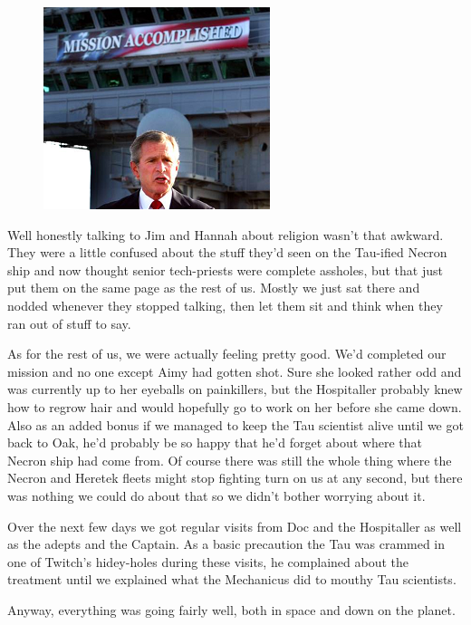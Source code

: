 \begin{figure}
	\begin{center}
		\includegraphics[width=\figwidth]{pics/11/94.png}
	\end{center}
\end{figure}
Well honestly talking to Jim and Hannah about religion wasn't that awkward. 
They were a little confused about the stuff they'd seen on the Tau-ified Necron ship and now thought senior tech-priests were complete assholes, but that just put them on the same page as the rest of us. 
Mostly we just sat there and nodded whenever they stopped talking, then let them sit and think when they ran out of stuff to say.

As for the rest of us, we were actually feeling pretty good. 
We'd completed our mission and no one except Aimy had gotten shot. 
Sure she looked rather odd and was currently up to her eyeballs on painkillers, but the Hospitaller probably knew how to regrow hair and would hopefully go to work on her before she came down. 
Also as an added bonus if we managed to keep the Tau scientist alive until we got back to Oak, he'd probably be so happy that he'd forget about where that Necron ship had come from. 
Of course there was still the whole thing where the Necron and Heretek fleets might stop fighting turn on us at any second, but there was nothing we could do about that so we didn't bother worrying about it.

Over the next few days we got regular visits from Doc and the Hospitaller as well as the adepts and the Captain. 
As a basic precaution the Tau was crammed in one of Twitch's hidey-holes during these visits, he complained about the treatment until we explained what the Mechanicus did to mouthy Tau scientists. 


Anyway, everything was going fairly well, both in space and down on the planet.

